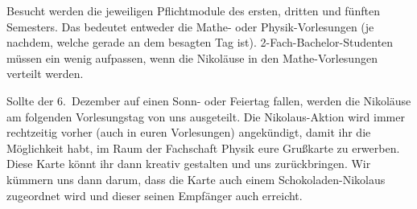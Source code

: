 \begin{multicols}{2}
Besucht werden die jeweiligen Pflichtmodule des ersten, dritten und fünften Semesters. Das bedeutet entweder die Mathe- oder Physik-Vorlesungen (je nachdem, welche gerade an dem besagten Tag ist). 2-Fach-Bachelor-Studenten müssen ein wenig aufpassen, wenn die Nikoläuse in den Mathe-Vorlesungen verteilt werden.

Sollte der 6.\ Dezember auf einen Sonn- oder Feiertag fallen, werden die Nikoläuse am folgenden Vorlesungstag von uns ausgeteilt. Die Nikolaus-Aktion wird immer rechtzeitig vorher (auch in euren Vorlesungen) angekündigt, damit ihr die Möglichkeit habt, im Raum der Fachschaft Physik eure Grußkarte zu erwerben. Diese Karte könnt ihr dann kreativ gestalten und uns zurückbringen. Wir kümmern uns dann darum, dass die Karte auch einem Schokoladen-Nikolaus zugeordnet wird und dieser seinen Empfänger auch erreicht.

\end{multicols}

\begin{center}
\end{center}
